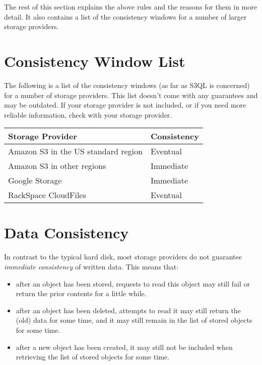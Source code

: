 \documentclass[letterpaper,10pt,english]{sphinxmanual}
\begin{document}
The rest of this section explains the above rules and the reasons for
them in more detail. It also contains a list of the consistency
windows for a number of larger storage providers.


\section{Consistency Window List}
\label{durability:consistency-window-list}
The following is a list of the consistency windows (as far as S3QL is
concerned) for a number of storage providers. This list doesn't come
with any guarantees and may be outdated. If your storage provider is
not included, or if you need more reliable information, check with
your storage provider.

\begin{tabulary}{\linewidth}{|L|L|}
\hline
\textbf{
Storage Provider
} & \textbf{
Consistency
}\\\hline

Amazon S3 in the US standard region
 & 
Eventual
\\\hline

Amazon S3 in other regions
 & 
Immediate
\\\hline

Google Storage
 & 
Immediate
\\\hline

RackSpace CloudFiles
 & 
Eventual
\\\hline
\end{tabulary}



\section{Data Consistency}
\label{durability:data-consistency}
In contrast to the typical hard disk, most storage providers do not
guarantee \emph{immediate consistency} of written data. This means that:
\begin{itemize}
\item {} 
after an object has been stored, requests to read this object may
still fail or return the prior contents for a little while.

\item {} 
after an object has been deleted, attempts to read it may still
return the (old) data for some time, and it may still remain in the
list of stored objects for some time.

\item {} 
after a new object has been created, it may still not be included
when retrieving the list of stored objects for some time.

\end{itemize}
\end{document}
